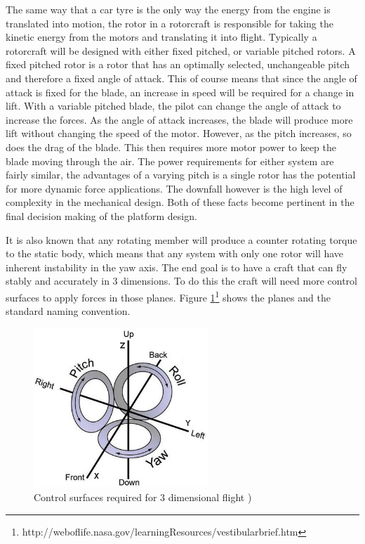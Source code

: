 The same way that a car tyre is the only way the energy from the engine is translated into motion, the rotor in a rotorcraft is responsible for taking the kinetic energy from the motors and translating it into flight. Typically a rotorcraft will be designed with either fixed pitched, or variable pitched rotors. A fixed pitched rotor is a rotor that has an optimally selected, unchangeable pitch and therefore a fixed angle of attack. This of course means that since the angle of attack is fixed for the blade, an increase in speed will be required for a change in lift. With a variable pitched blade, the pilot can change the angle of attack to increase the forces. As the angle of attack increases, the blade will produce more lift without changing the speed of the motor. However, as the pitch increases, so does the drag of the blade. This then requires more motor power to keep the blade moving through the air.
The power requirements for either system are fairly similar, the advantages of a varying pitch is a single rotor has the potential for more dynamic force applications. The downfall however is the high level of complexity in the mechanical design. Both of these facts become pertinent in the final decision making of the platform design.

It is also known that any rotating member will produce a counter rotating torque to the static body, which means that any system with only one rotor will have inherent instability in the yaw axis. The end goal is to have a craft that can fly stably and accurately in 3 dimensions. To do this the craft will need more control surfaces to apply forces in those planes. Figure \ref{IM_PRY}\footnote{http://weboflife.nasa.gov/learningResources/vestibularbrief.htm} shows the planes and the standard naming convention. 

\begin{figure}[H]
	\centering
	\includegraphics[height = 6cm]{Images/Literature/RollPitchYaw}     
	\caption{Control surfaces required for 3 dimensional flight \cite{Heli})}
	\label{IM_PRY}
\end{figure}

